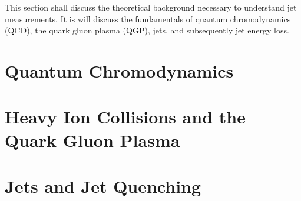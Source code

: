 
This section shall discuss the theoretical background necessary to understand jet measurements. It is will discuss the fundamentals of quantum chromodynamics (QCD), the quark gluon plasma (QGP),  jets, and subsequently jet energy loss. 


\section{Quantum Chromodynamics}
\label{sec:qcd}


\section{Heavy Ion Collisions and the Quark Gluon Plasma}
\label{sec:qgp}


\section{Jets and Jet Quenching}
\label{sec:jets}


